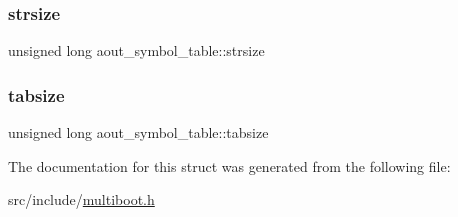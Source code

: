 \mbox{\label{structaout__symbol__table_a62501946eea0a9aa53864aec0fbf8c16}} 
\subsubsection{\texorpdfstring{strsize}{strsize}}
{\footnotesize\ttfamily unsigned long aout\+\_\+symbol\+\_\+table\+::strsize}

\mbox{\label{structaout__symbol__table_ac3c6d6aa9cdf59ae4ef83d2aaa679394}} 
\subsubsection{\texorpdfstring{tabsize}{tabsize}}
{\footnotesize\ttfamily unsigned long aout\+\_\+symbol\+\_\+table\+::tabsize}



The documentation for this struct was generated from the following file\+:\begin{DoxyCompactItemize}
\item 
src/include/\hyperlink{multiboot_8h}{multiboot.\+h}\end{DoxyCompactItemize}
